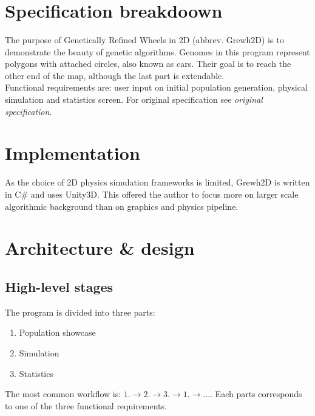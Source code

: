 \documentclass[a4paper]{article}
\begin{document}
\text{}\vspace{1.1cm}
\begin{center}
	{\huge {}} \vspace{0.3cm} \\ 
	{\small {}} \vspace{0.1cm} \\
	{\small {}} \vspace{0.5cm} \\
	{\normalsize {}} \vspace{0.2cm} \\
	{\normalsize {}} \vspace{0.5cm} \\
\end{center}

\section*{Specification breakdoown}
The purpose of Genetically Refined Wheels in 2D (abbrev. Grewh2D) is to demonstrate the beauty of genetic algorithms. Genomes in this program represent polygons with attached circles, also known as cars. Their goal is to reach the other end of the map, although the last part is extendable. \\
Functional requirements are: user input on initial population generation, physical simulation and statistics screen.
For original specification see \textit{original specification}.

\section*{Implementation}
 As the choice of 2D physics simulation frameworks is limited, Grewh2D is written in C\# and uses Unity3D. This offered the author to focus more on larger scale algorithmic background than on graphics and physics pipeline.

\section*{Architecture \& design}
\subsection*{High-level stages}
	The program is divided into three parts:
	\begin{enumerate}
		\item Population showcase 
		\item Simulation
		\item Statistics
	\end{enumerate}
	The most common workflow is: $1. \rightarrow 2. \rightarrow 3. \rightarrow 1. \rightarrow ...$. Each parts corresponds to one of the three functional requirements.
\end{document}

